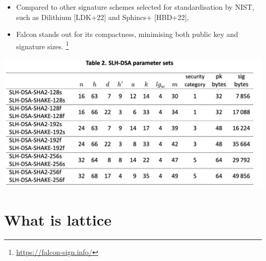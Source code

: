 \documentclass{beamer}
\begin{document}
\begin{frame}
\begin{itemize}
	\item Compared to other signature schemes selected for standardisation by NIST, such as Dilithium [LDK+22] and Sphincs+ [HBD+22], 
	\item Falcon stands out for its compactness, minimising both public key and signature sizes. \footnote{\url{https://falcon-sign.info/}}
\end{itemize}

 \centering

\includegraphics[scale=0.3]{slhdsa.png}
\end{frame}

\section{What is lattice}
\end{document}
